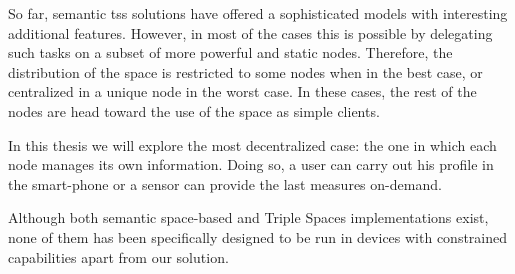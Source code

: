 
So far, semantic \aclp{ts} solutions have offered a sophisticated models with interesting additional features.
However, in most of the cases this is possible by delegating such tasks on a subset of more powerful and static nodes.
Therefore, the distribution of the space is restricted to some nodes when in the best case, or centralized in a unique node in the worst case.
In these cases, the rest of the nodes are head toward the use of the space as simple clients.


In this thesis we will explore the most decentralized case: the one in which each node manages its own information.
Doing so, a user can carry out his profile in the smart-phone or a sensor can provide the last measures on-demand.



Although both semantic space-based and Triple Spaces implementations exist, none of them has been specifically designed to be run in devices with constrained capabilities apart from our solution.